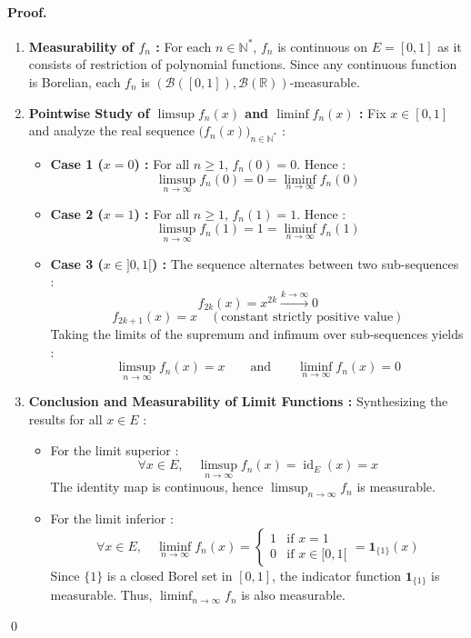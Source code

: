 \paragraph{Proof.}
\begin{enumerate}[label=\arabic*.]
    \item \textbf{Measurability of $f_n$ :}
    For each $n \in \mathbb{N}^*$, $f_n$ is continuous on $E = [0, 1]$ as it consists of restriction of polynomial functions. Since any continuous function is Borelian, each $f_n$ is $(\mathcal{B}([0, 1]), \mathcal{B}(\mathbb{R}))$-measurable.

    \item \textbf{Pointwise Study of $\limsup f_n(x)$ and $\liminf f_n(x)$ :}
    Fix $x \in [0, 1]$ and analyze the real sequence $\big(f_n(x)\big)_{n \in \mathbb{N}^*}$ :
    \begin{itemize}
        \item \textbf{Case 1 ($x = 0$) :} For all $n \ge 1$, $f_n(0) = 0$. Hence :
        \[
            \limsup_{n \to \infty} f_n(0) = 0 = \liminf_{n \to \infty} f_n(0)
        \]
        \item \textbf{Case 2 ($x = 1$) :} For all $n \ge 1$, $f_n(1) = 1$. Hence :
        \[
            \limsup_{n \to \infty} f_n(1) = 1 = \liminf_{n \to \infty} f_n(1)
        \]
        \item \textbf{Case 3 ($x \in ]0, 1[$) :} The sequence alternates between two sub-sequences :
        \[
            f_{2k}(x) = x^{2k} \xrightarrow{k \to \infty} 0
        \]
        \[
            f_{2k+1}(x) = x \quad (\text{constant strictly positive value})
        \]
        Taking the limits of the supremum and infimum over sub-sequences yields :
        \[
            \limsup_{n \to \infty} f_n(x) = x \qquad \text{and} \qquad \liminf_{n \to \infty} f_n(x) = 0
        \]
    \end{itemize}

    \item \textbf{Conclusion and Measurability of Limit Functions :}
    Synthesizing the results for all $x \in E$ :
    \begin{itemize}
        \item For the limit superior :
        \[
            \forall x \in E, \quad \limsup_{n \to \infty} f_n(x) = \operatorname{id}_E(x) = x
        \]
        The identity map is continuous, hence $\limsup_{n \to \infty} f_n$ is measurable.

        \item For the limit inferior :
        \[
            \forall x \in E, \quad \liminf_{n \to \infty} f_n(x) = 
            \begin{cases}
                1 & \text{if } x = 1 \\
                0 & \text{if } x \in [0, 1[
            \end{cases}
            = \mathbf{1}_{\{1\}}(x)
        \]
        Since $\{1\}$ is a closed Borel set in $[0, 1]$, the indicator function $\mathbf{1}_{\{1\}}$ is measurable. Thus, $\liminf_{n \to \infty} f_n$ is also measurable.
    \end{itemize}
\end{enumerate}
\qed

